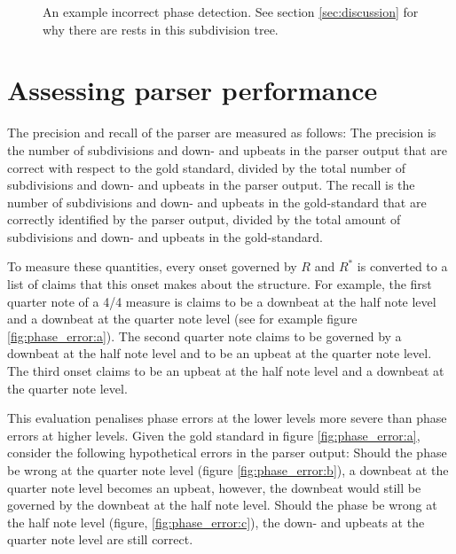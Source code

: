 \begin{figure}
\centering
{}
\caption{An example incorrect phase detection. See section \ref{sec:discussion} for why there are rests in this subdivision tree.}
\label{fig:phase_error}
\end{figure}

\section{Assessing parser performance}

The precision and recall of the parser are measured as follows: The precision is the number of subdivisions and down- and upbeats in the parser output that are correct with respect to the gold standard, divided by the total number of subdivisions and down- and upbeats in the parser output. The recall is the number of subdivisions and down- and upbeats in the gold-standard that are correctly identified by the parser output, divided by the total amount of subdivisions and down- and upbeats in the gold-standard.

To measure these quantities, every onset governed by $R$ and $R^*$ is converted to a list of claims that this onset makes about the structure. For example, the first quarter note of a 4/4 measure is claims to be a downbeat at the half note level and a downbeat at the quarter note level (see for example figure \ref{fig:phase_error:a}). The second quarter note claims to be governed by a downbeat at the half note level and to be an upbeat at the quarter note level. The third onset claims to be an upbeat at the half note level and a downbeat at the quarter note level. 

This evaluation penalises phase errors at the lower levels more severe than phase errors at higher levels. Given the gold standard in figure \ref{fig:phase_error:a}, consider the following hypothetical errors in the parser output: Should the phase be wrong at the quarter note level (figure \ref{fig:phase_error:b}), a downbeat at the quarter note level becomes  an upbeat, however, the downbeat would still be governed by the downbeat at the half note level. Should the phase be wrong at the half note level (figure, \ref{fig:phase_error:c}), the down- and upbeats at the quarter note level are still correct.

